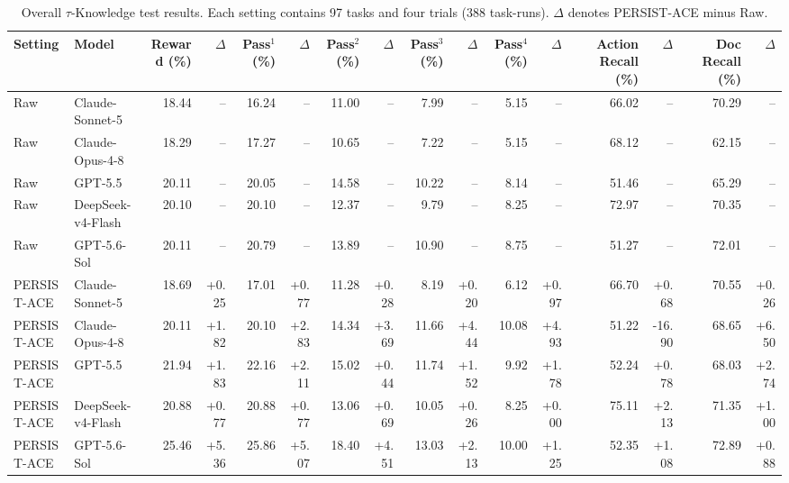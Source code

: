 \begin{table}[!t]
\centering
\scriptsize
\setlength{\tabcolsep}{1.5pt}
\renewcommand{\arraystretch}{0.95}
\begin{tabular*}{\textwidth}{@{\extracolsep{\fill}}ll*{14}{r}@{}}
\toprule
Setting & Model & Reward (\%) & $\Delta$ & Pass$^1$ (\%) & $\Delta$ & Pass$^2$ (\%) & $\Delta$ & Pass$^3$ (\%) & $\Delta$ & Pass$^4$ (\%) & $\Delta$ & Action Recall (\%) & $\Delta$ & Doc Recall (\%) & $\Delta$ \\
\midrule


Raw & Claude-Sonnet-5  & 18.44 & -- & 16.24 & -- & 11.00 & -- & 7.99 & -- & 5.15 & -- & 66.02 & -- & 70.29 & -- \\
Raw & Claude-Opus-4-8  & 18.29 & -- & 17.27 & -- & 10.65 & -- & 7.22 & -- & 5.15 & -- & 68.12 & -- & 62.15 & -- \\
Raw & GPT-5.5 & 20.11 & -- & 20.05 & -- & 14.58 & -- & 10.22 & -- & 8.14 & -- & 51.46 & -- & 65.29 & -- \\
Raw & DeepSeek-v4-Flash & 20.10 & -- & 20.10 & -- & 12.37 & -- & 9.79 & -- & 8.25 & -- & 72.97 & -- & 70.35 & -- \\
Raw & GPT-5.6-Sol  & 20.11 & -- & 20.79 & -- & 13.89 & -- & 10.90 & -- & 8.75 & -- & 51.27 & -- & 72.01 & -- \\


PERSIST-ACE & Claude-Sonnet-5  & 18.69 & +0.25 & 17.01 & +0.77 & 11.28 & +0.28 & 8.19 & +0.20 & 6.12 & +0.97 & 66.70 & +0.68 & 70.55 & +0.26 \\
PERSIST-ACE & Claude-Opus-4-8 & 20.11 & +1.82 & 20.10 & +2.83 & 14.34 & +3.69 & 11.66 & +4.44 & 10.08 & +4.93 & 51.22 & -16.90 & 68.65 & +6.50 \\
PERSIST-ACE & GPT-5.5 & 21.94 & +1.83 & 22.16 & +2.11 & 15.02 & +0.44 & 11.74 & +1.52 & 9.92 & +1.78 & 52.24 & +0.78 & 68.03 & +2.74 \\
PERSIST-ACE & DeepSeek-v4-Flash & 20.88 & +0.77 & 20.88 & +0.77 & 13.06 & +0.69 & 10.05 & +0.26 & 8.25 & +0.00 & 75.11 & +2.13 & 71.35 & +1.00 \\
PERSIST-ACE & GPT-5.6-Sol  & 25.46 & +5.36 & 25.86 & +5.07 & 18.40 & +4.51 & 13.03 & +2.13 & 10.00 & +1.25 & 52.35 & +1.08 & 72.89 & +0.88 \\
\bottomrule
\end{tabular*}
\renewcommand{\arraystretch}{1.0}
\caption{Overall $\tau$-Knowledge test results. Each setting contains 97 tasks
and four trials (388 task-runs). $\Delta$ denotes PERSIST-ACE minus Raw.}
\label{tab:tau-main}
\end{table}

